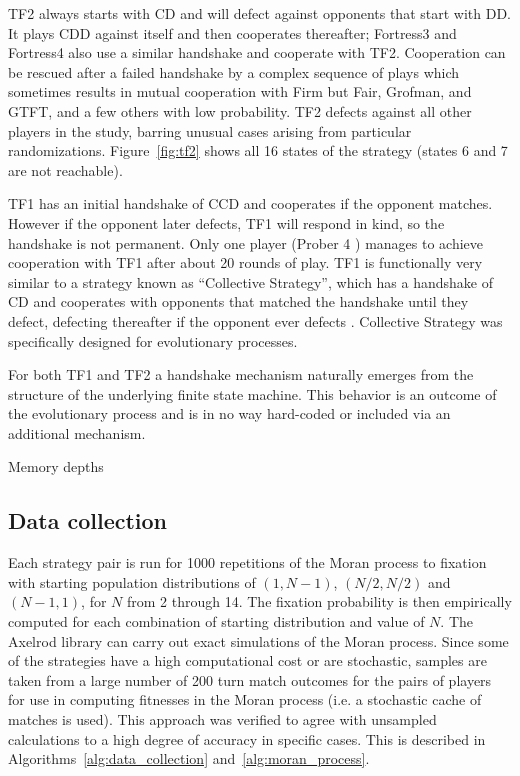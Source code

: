 \documentclass[10pt,journal]{IEEEtran}
\begin{document}
TF2 always starts with CD and will defect against opponents that start with
DD\@. It plays CDD against itself and then cooperates thereafter; Fortress3 and
Fortress4 also use a similar handshake and cooperate with TF2. Cooperation
can be rescued after a failed handshake by a complex sequence of plays
which sometimes results in mutual cooperation with Firm but Fair, Grofman, and
GTFT, and a few others with low probability. TF2 defects against all other
players in the study, barring
unusual cases arising from particular randomizations. Figure~\ref{fig:tf2} shows
all 16 states of the strategy (states 6 and 7 are not reachable).

TF1 has an initial handshake of CCD and cooperates if the opponent matches.
However if the opponent later defects, TF1 will respond in kind, so the
handshake is not permanent. Only one player (Prober 4 \cite{Prison1998}) manages to
achieve cooperation with TF1 after about 20 rounds of play. TF1 is functionally
very similar to a strategy known as ``Collective Strategy'', which has a
handshake of CD and cooperates with opponents that matched the handshake
until they defect, defecting thereafter if the opponent ever defects \cite{Li2009}.
Collective Strategy was specifically designed for evolutionary processes.

For both TF1 and TF2 a handshake
mechanism naturally emerges from the structure of the underlying finite state
machine. This behavior is an outcome of the evolutionary process and is in no
way hard-coded or included via an additional mechanism.

\begin{table}[!hbtp]
    \centering
        \scalebox{0.7}{}
        \caption{Memory depths}
        \label{tbl:memory_depth_count}
\end{table}

\subsection{Data collection}\label{sec:data_collection}

Each strategy pair is run for 1000 repetitions of the Moran process to fixation
with starting population distributions of $(1, N-1)$, $(N/2, N/2)$ and $(N-1 ,
1)$, for \(N\) from 2 through 14. The fixation probability is then empirically
computed for each combination of starting distribution and value of \(N\).  The
Axelrod library can carry out exact simulations of the Moran process. Since some
of the strategies have a high computational cost or are stochastic, samples are
taken from a large number of 200 turn match outcomes for the pairs of players
for use in computing fitnesses in the Moran process (i.e. a stochastic cache of
matches is used). This approach was verified to agree with unsampled
calculations to a high degree of accuracy in specific cases.  This is described
in Algorithms~\ref{alg:data_collection} and~\ref{alg:moran_process}.
\end{document}
